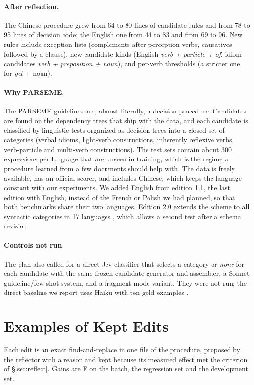 \paragraph{After reflection.} The Chinese procedure grew from 64 to 80 lines of candidate rules and from 78 to 95 lines of decision code; the English one from 44 to 83 and from 69 to 96. New rules include exception lists (complements after perception verbs, causatives followed by a clause), new candidate kinds (English \emph{verb + particle + of}, idiom candidates \emph{verb + preposition + noun}), and per-verb thresholds (a stricter one for \emph{get} + noun).

\paragraph{Why PARSEME.} The PARSEME guidelines are, almost literally, a decision procedure. Candidates are found on the dependency trees that ship with the data, and each candidate is classified by linguistic tests organized as decision trees into a closed set of categories (verbal idioms, light-verb constructions, inherently reflexive verbs, verb-particle and multi-verb constructions). The test sets contain about 300 expressions per language that are unseen in training, which is the regime a procedure learned from a few documents should help with. The data is freely available, has an official scorer, and includes Chinese, which keeps the language constant with our \umr experiments. We added English from edition 1.1, the last edition with English, instead of the French or Polish we had planned, so that both benchmarks share their two languages. Edition 2.0 extends the scheme to all syntactic categories in 17 languages \citep{scholivet2026parseme}, which allows a second test after a schema revision.

\paragraph{Controls not run.} The plan also called for a direct Jev classifier that selects a category or \emph{none} for each candidate with the same frozen candidate generator and assembler, a Sonnet guideline/few-shot system, and a fragment-mode variant. They were not run; the direct baseline we report uses Haiku with ten gold examples .

\section{Examples of Kept Edits}
\label{app:edits}
Each edit is an exact find-and-replace in one file of the procedure, proposed by the reflector with a reason and kept because its measured effect met the criterion of \S\ref{sec:reflect}. Gains are F on the batch, the regression set and the development set.

